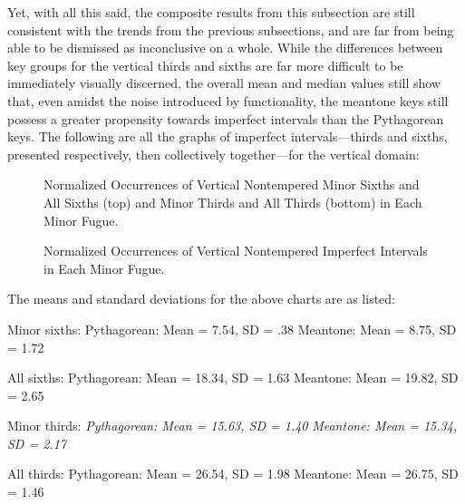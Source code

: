 Yet, with all this said, the composite results from this subsection are
still consistent with the trends from the previous subsections, and are
far from being able to be dismissed as inconclusive on a whole. While
the differences between key groups for the vertical thirds and sixths
are far more difficult to be immediately visually discerned, the overall
mean and median values still show that, even amidst the noise introduced
by functionality, the meantone keys still possess a greater propensity
towards imperfect intervals than the Pythagorean keys. The following are
all the graphs of imperfect intervals---thirds and sixths, presented
respectively, then collectively together---for the vertical domain:


    \begin{center}
    \end{center}
    


\begin{figure}[H]
\vspace{1.5em}
    \centering
    \caption[Normalized Occurrences of Vertical Nontempered Thirds and Sixths in Each Minor Fugue. ]{Normalized Occurrences of Vertical Nontempered Minor Sixths and All Sixths (top) and Minor Thirds and All Thirds (bottom) in Each Minor Fugue.}
\end{figure}


\begin{figure}[H]
\vspace{1.5em}
    \centering
    \caption{Normalized Occurrences of Vertical Nontempered Imperfect Intervals in Each Minor Fugue. }
\end{figure}    The means and standard deviations for the above charts are as listed:

Minor sixths: Pythagorean: Mean = 7.54, SD = .38 Meantone: Mean = 8.75,
SD = 1.72

All sixths: Pythagorean: Mean = 18.34, SD = 1.63 Meantone: Mean = 19.82,
SD = 2.65

Minor thirds: \emph{Pythagorean: Mean = 15.63, SD = 1.40}
\emph{Meantone: Mean = 15.34, SD = 2.17}

All thirds: Pythagorean: Mean = 26.54, SD = 1.98 Meantone: Mean = 26.75,
SD = 1.46

